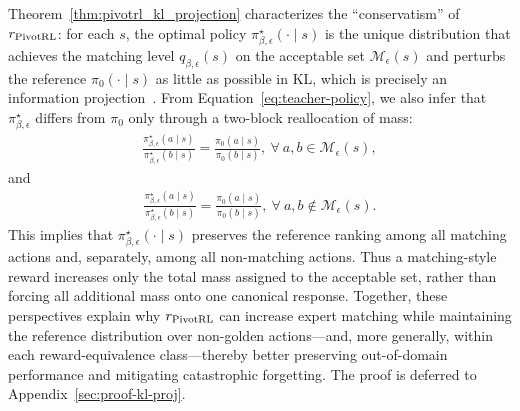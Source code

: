 Theorem~\ref{thm:pivotrl_kl_projection} characterizes the ``conservatism'' of $r_{\name}$:
for each $s$, the optimal policy $\pi_{\beta,\epsilon}^\star(\cdot\mid s)$ is the unique distribution that achieves the matching level $q_{\beta,\epsilon}(s)$ on the acceptable set $\mathcal M_\epsilon(s)$ and perturbs the reference $\pi_0(\cdot\mid s)$ as little as possible in KL, which is precisely an information projection~\citep{csiszar1975divergence,bregman1967relaxation}.
From Equation~\eqref{eq:teacher-policy}, we also infer that $\pi_{\beta,\epsilon}^\star$ differs from $\pi_0$ only through a two-block reallocation of mass:
\begin{align*}
\frac{\pi_{\beta,\epsilon}^\star(a\mid s)}{\pi_{\beta,\epsilon}^\star(b\mid s)}=\frac{\pi_0(a\mid s)}{\pi_0(b\mid s)}, ~\forall~a,b\in \mathcal M_\epsilon(s),
\end{align*}
and
\begin{align*}
\frac{\pi_{\beta,\epsilon}^\star(a\mid s)}{\pi_{\beta,\epsilon}^\star(b\mid s)}=\frac{\pi_0(a\mid s)}{\pi_0(b\mid s)}, ~\forall~a,b\notin \mathcal M_\epsilon(s).
\end{align*}
This implies that $\pi_{\beta,\epsilon}^\star(\cdot\mid s)$ preserves the reference ranking among all matching actions and, separately, among all non-matching actions.
Thus a matching-style reward increases only the total mass assigned to the acceptable set, rather than forcing all additional mass onto one canonical response.
Together, these perspectives explain why $r_{\name}$ can increase expert matching while maintaining the reference distribution over non-golden actions---and, more generally, within each reward-equivalence class---thereby better preserving out-of-domain performance and mitigating catastrophic forgetting.
The proof is deferred to Appendix~\ref{sec:proof-kl-proj}.